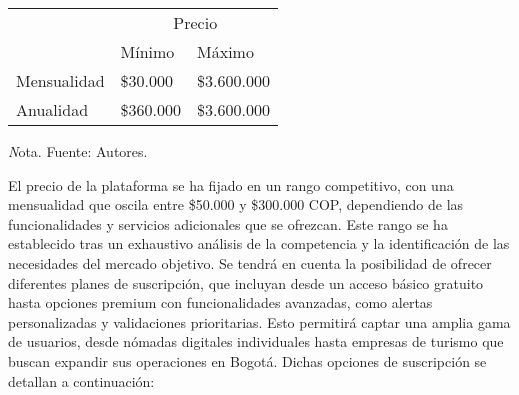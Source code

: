 \begin{adjustbox}{
            center,
            caption=[{Precio en el mercado actual}]{\centering Precio en el mercado actual (Valores en pesos colombianos COP). },
            label={Precio},
            nofloat=table, vspace={20px}}
            {
       \begin{threeparttable}
           \begin{tabular}{|p{11cm}|p{10cm}p{2cm}|}
                \hline
                \rowcolor[HTML]{D9EAD3} 
                \cellcolor[HTML]{D9EAD3}                              & \multicolumn{2}{c|}{\cellcolor[HTML]{D9EAD3}Precio}            \\ \cline{2-3} 
                \rowcolor[HTML]{D9EAD3} 
                 \multirow{-2}{*}{\cellcolor[HTML]{D9EAD3}Suscripción} & \multicolumn{1}{l|}{\cellcolor[HTML]{D9EAD3}Mínimo} & Máximo   \\ \hline
                                \multicolumn{1}{|l|}{Mensualidad}                     & \multicolumn{1}{l|}{\$30.000}                       & \$3.600.000 \\ \hline
                                \multicolumn{1}{|l|}{Anualidad}                       & \multicolumn{1}{l|}{\$360.000}                      & \$3.600.000 \\ \hline      \end{tabular}
            \begin{tablenotes}
                \vspace{2mm}
               \textit Nota. Fuente: Autores.
            \end{tablenotes}
            
        \end{threeparttable}
    }

\end{adjustbox}

El precio de la plataforma se ha fijado en un rango competitivo, con una mensualidad que oscila entre \$50.000 y \$300.000 COP, dependiendo de las funcionalidades y servicios adicionales que se ofrezcan. Este rango se ha establecido tras un exhaustivo análisis de la competencia y la identificación de las necesidades del mercado objetivo.
Se tendrá en cuenta la posibilidad de ofrecer diferentes planes de suscripción, que incluyan desde un acceso básico gratuito hasta opciones premium con funcionalidades avanzadas, como alertas personalizadas y validaciones prioritarias. Esto permitirá captar una amplia gama de usuarios, desde nómadas digitales individuales hasta empresas de turismo que buscan expandir sus operaciones en Bogotá. Dichas opciones de suscripción se detallan a continuación:

